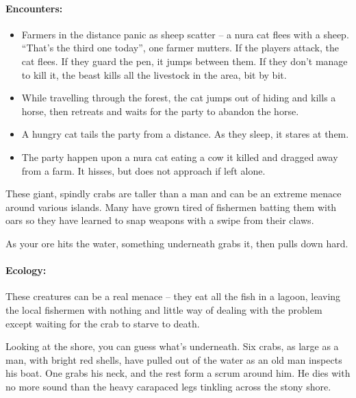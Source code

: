 \begin{multicols}{2}
\paragraph{Encounters:}

\begin{itemize}

  \item
  Farmers in the distance panic as sheep scatter -- a nura cat flees with a sheep.
  ``That's the third one today'', one farmer mutters.
  If the players attack, the cat flees.
  If they guard the pen, it jumps between them.
  If they don't manage to kill it, the beast kills all the livestock in the area, bit by bit.
  \item
  While travelling through the forest, the cat jumps out of hiding and kills a horse, then retreats and waits for the party to abandon the horse.
  \item
  A hungry cat tails the party from a distance.
  As they sleep, it stares at them.
  \item
  The party happen upon a nura cat eating a cow it killed and dragged away from a farm.
  It hisses, but does not approach if left alone.

\end{itemize}

\nuracat

\label{nura_crab}

These giant, spindly crabs are taller than a man and can be an extreme menace around various islands.
Many have grown tired of fishermen batting them with oars so they have learned to snap weapons with a swipe from their claws.

\begin{boxtext}

  As your ore hits the water, something underneath grabs it, then pulls down hard.

\end{boxtext}

\paragraph{Ecology:} These creatures can be a real menace -- they eat all the fish in a lagoon, leaving the local fishermen with nothing and little way of dealing with the problem except waiting for the crab to starve to death.

\begin{boxtext}

  Looking at the shore, you can guess what's underneath.
  Six crabs, as large as a man, with bright red shells, have pulled out of the water as an old man inspects his boat.
  One grabs his neck, and the rest form a scrum around him.
  He dies with no more sound than the heavy carapaced legs tinkling across the stony shore.


\end{boxtext}
\end{multicols}
